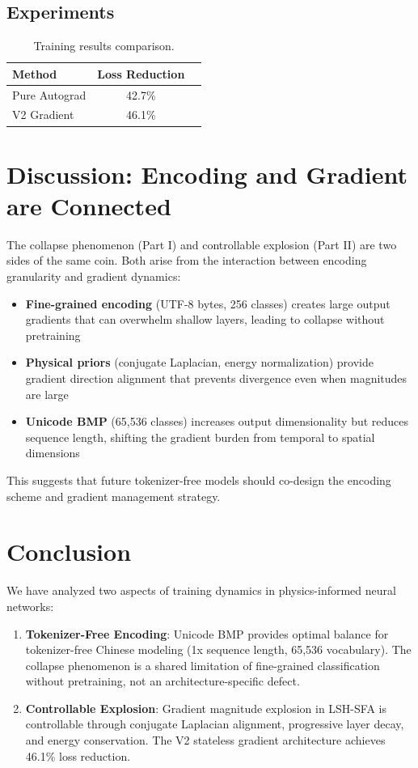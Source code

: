 \documentclass{article}
\begin{document}
\subsection{Experiments}

\begin{table}[h]
\centering
\caption{Training results comparison.}
\label{tab:results}
\begin{tabular}{lcc}
\toprule
\textbf{Method} & \textbf{Loss Reduction} \\
\midrule
Pure Autograd & 42.7\% \\
V2 Gradient & 46.1\% \\
\bottomrule
\end{tabular}
\end{table}

\section{Discussion: Encoding and Gradient are Connected}

The collapse phenomenon (Part I) and controllable explosion (Part II) are two sides of the same coin. Both arise from the interaction between encoding granularity and gradient dynamics:

\begin{itemize}
\item \textbf{Fine-grained encoding} (UTF-8 bytes, 256 classes) creates large output gradients that can overwhelm shallow layers, leading to collapse without pretraining
\item \textbf{Physical priors} (conjugate Laplacian, energy normalization) provide gradient direction alignment that prevents divergence even when magnitudes are large
\item \textbf{Unicode BMP} (65,536 classes) increases output dimensionality but reduces sequence length, shifting the gradient burden from temporal to spatial dimensions
\end{itemize}

This suggests that future tokenizer-free models should co-design the encoding scheme and gradient management strategy.

\section{Conclusion}

We have analyzed two aspects of training dynamics in physics-informed neural networks:

\begin{enumerate}
\item \textbf{Tokenizer-Free Encoding}: Unicode BMP provides optimal balance for tokenizer-free Chinese modeling (1x sequence length, 65,536 vocabulary). The collapse phenomenon is a shared limitation of fine-grained classification without pretraining, not an architecture-specific defect.
\item \textbf{Controllable Explosion}: Gradient magnitude explosion in LSH-SFA is controllable through conjugate Laplacian alignment, progressive layer decay, and energy conservation. The V2 stateless gradient architecture achieves 46.1\% loss reduction.
\end{enumerate}
\end{document}
